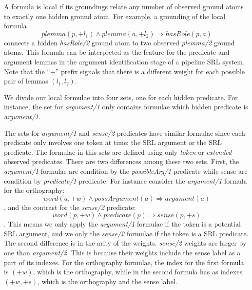 
A formula is local if its groundings relate any number of observed ground atoms 
to exactly one hidden ground atom.  For example, a grounding of the local 
formula \[plemma(p,+l_1) \wedge plemma(a,+l_2) \Rightarrow hasRole(p,a)\]
connects a hidden \emph{hasRole/2} ground atom to two observed \emph{plemma/2} 
ground atoms. This formula can be interpreted as the feature for the predicate 
and argument lemmas in the argument identification stage of a pipeline SRL 
system.
Note that the ``+'' prefix signals that there is a different weight for each 
possible pair of lemmas $(l_1,l_2)$.

We divide our local formulae into four sets, one for each hidden predicate.  For 
instance, the set for \emph{argument/1} only contains formulae which hidden 
predicate is \emph{argument/1}. 

The sets for \emph{argument/1} and \emph{sense/2} predicates have similar 
formulae since each predicate only involves one token at time: the SRL argument 
or the SRL predicate. The formulae in this sets are defined using only 
\emph{token} or \emph{extended} observed predicates. There are two differences 
among these two sets.  First, the \emph{argument/1} formulae are condition by
the \emph{possibleArg/1} predicate while sense are condition by 
\emph{predicate/1} predicate. For instance consider the \emph{argument/1} 
formula for the orthography: \[word(a,+w) \land possArgument(a) \Rightarrow 
argument(a)\], and the contrast for the \emph{sense/2} predicate: \[word(p,+w) 
\land predicate(p) \Rightarrow sense(p,+s)\]. This means we only apply the 
\emph{argument/1} formulae if the token is a potential SRL argument, and we only 
the \emph{sense/2} formulae if the token is a SRL predicate. The second 
difference is in the arity of the weights. \emph{sense/2} weights are larger by 
one than \emph{argument/2}. This is because their weights include the sense 
label as a part of its indexes. For the orthography formulae, the index for the
first formula is $(+w)$, which is the orthography, while in the second formula 
has as indexes $(+w,+s)$, which is the orthography and the sense label.

